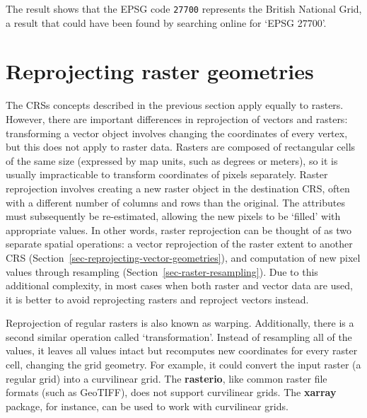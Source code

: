 \documentclass[
  letterpaper,
]{krantz}
\begin{document}
The result shows that the EPSG code \texttt{27700} represents the
British National Grid, a result that could have been found by searching
online for `EPSG 27700'.

\section{Reprojecting raster
geometries}\label{sec-reprojecting-raster-geometries}

The CRSs concepts described in the previous section apply equally to
rasters. However, there are important differences in reprojection of
vectors and rasters: transforming a vector object involves changing the
coordinates of every vertex, but this does not apply to raster data.
Rasters are composed of rectangular cells of the same size (expressed by
map units, such as degrees or meters), so it is usually impracticable to
transform coordinates of pixels separately. Raster reprojection involves
creating a new raster object in the destination CRS, often with a
different number of columns and rows than the original. The attributes
must subsequently be re-estimated, allowing the new pixels to be
`filled' with appropriate values. In other words, raster reprojection
can be thought of as two separate spatial operations: a vector
reprojection of the raster extent to another CRS
(Section~\ref{sec-reprojecting-vector-geometries}), and computation of
new pixel values through resampling
(Section~\ref{sec-raster-resampling}). Due to this additional
complexity, in most cases when both raster and vector data are used, it
is better to avoid reprojecting rasters and reproject vectors instead.

\begin{tcolorbox}[enhanced jigsaw, breakable, title=\textcolor{quarto-callout-note-color}{\faInfo}\hspace{0.5em}{Note}, arc=.35mm, opacitybacktitle=0.6, left=2mm, colback=white, bottomrule=.15mm, bottomtitle=1mm, toptitle=1mm, colframe=quarto-callout-note-color-frame, leftrule=.75mm, rightrule=.15mm, toprule=.15mm, titlerule=0mm, opacityback=0, colbacktitle=quarto-callout-note-color!10!white, coltitle=black]

Reprojection of regular rasters is also known as warping. Additionally,
there is a second similar operation called `transformation'. Instead of
resampling all of the values, it leaves all values intact but recomputes
new coordinates for every raster cell, changing the grid geometry. For
example, it could convert the input raster (a regular grid) into a
curvilinear grid. The \textbf{rasterio}, like common raster file formats
(such as GeoTIFF), does not support curvilinear grids. The
\textbf{xarray} package, for instance, can be used to work with
curvilinear grids.

\end{tcolorbox}
\end{document}
